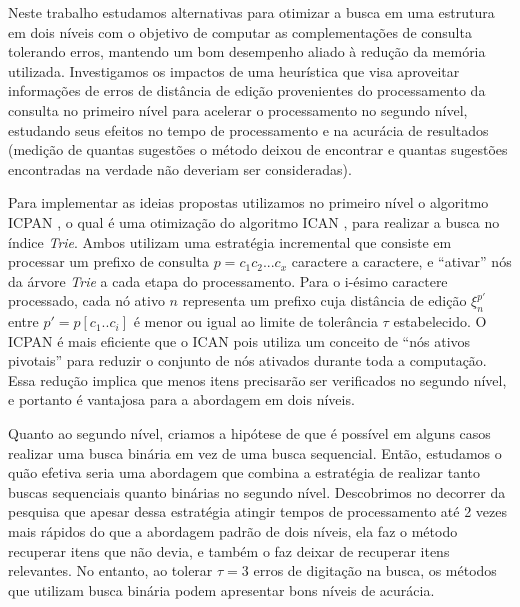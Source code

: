 Neste trabalho estudamos alternativas para otimizar a busca em uma estrutura em dois níveis com o objetivo de computar as complementações de consulta tolerando erros, mantendo um bom desempenho aliado à redução da memória utilizada. Investigamos os impactos de uma heurística que visa aproveitar informações de erros de distância de edição provenientes do processamento da consulta no primeiro nível para acelerar o processamento no segundo nível, estudando seus efeitos no tempo de processamento e na acurácia de resultados (medição de quantas sugestões o método deixou de encontrar e quantas sugestões encontradas na verdade não deveriam ser consideradas). 

Para implementar as ideias propostas utilizamos no primeiro nível o algoritmo ICPAN \citep{li2011efficient}, o qual é uma otimização do algoritmo ICAN \citep{ji2009efficient}, para realizar a busca no índice \textit{Trie}. Ambos utilizam uma estratégia incremental que consiste em processar um prefixo de consulta $p=c_{1}c_{2}...c_{x}$ caractere a caractere, e ``ativar'' nós da árvore \textit{Trie} a cada etapa do processamento. Para o i-ésimo caractere processado, cada nó ativo $n$ representa um prefixo cuja distância de edição $\xi_{n}^{p'}$ entre $p'=p[c_{1}..c_{i}]$ é menor ou igual ao limite de tolerância $\tau$ estabelecido. O ICPAN é mais eficiente que o ICAN pois utiliza um conceito de ``nós ativos pivotais'' para reduzir o conjunto de nós ativados durante toda a computação. Essa redução implica que menos itens precisarão ser verificados no segundo nível, e portanto é vantajosa para a abordagem em dois níveis.

Quanto ao segundo nível, criamos a hipótese de que é possível em alguns casos realizar uma busca binária em vez de uma busca sequencial. Então, estudamos o quão efetiva seria uma abordagem que combina a estratégia de realizar tanto buscas sequenciais quanto binárias no segundo nível. Descobrimos no decorrer da pesquisa que apesar dessa estratégia atingir tempos de processamento até 2 vezes mais rápidos do que a abordagem padrão de dois níveis, ela faz o método recuperar itens que não devia, e também o faz deixar de recuperar itens relevantes. No entanto, ao tolerar $\tau=3$ erros de digitação na busca, os métodos que utilizam busca binária podem apresentar bons níveis de acurácia.

